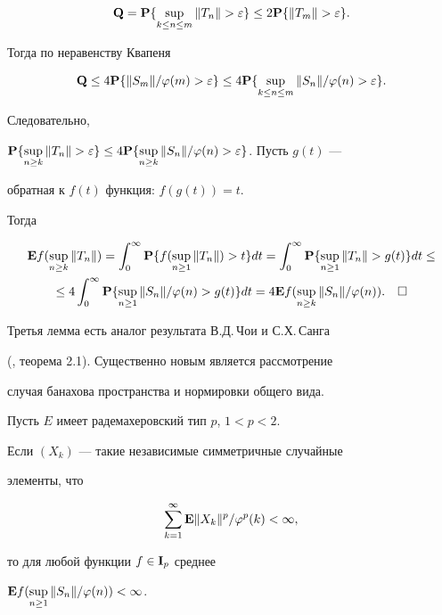 $$


\bold Q=\bold P \{\sup_{k\le n\le m}\| T_{n}\| >


\varepsilon \}\le 2\bold P \{\| T_{m} \| >\varepsilon \}.


$$


Тогда по неравенству Квапеня


$$


\bold Q \le 4{\bold P}


\{\| S_{m} \| /\varphi (m)>\varepsilon \}


\le 4{\bold P} \{ \sup_{k\le n\le m} \| S_{n} \| /


\varphi (n)>\varepsilon \}.


$$


Следовательно,


${\bold P} \{\sup\limits_{n\ge k}\| T_{n} \|>


\varepsilon \}\le 4{\bold P} \{\sup\limits_{n\ge k}\| S_{n}\|


/\varphi (n)>\varepsilon \}$. Пусть $g(t)$ ---


обратная к $f(t)$ функция: $f(g(t))=t$.


Тогда


\begin{multline*}


{\bold E} f(\sup_{n\ge k}\|T_{n} \|)


=\int_0^{\infty}{\bold P} \{f(\sup_{n\ge 1}\|T_{n} \|)>t\}dt= 


\int_0^{\infty}{\bold P} \{\sup_{n\ge 1}\|T_{n} \|>g(t)\}dt\le\\


%


\le 4\int_0^{\infty}{\bold P} \{\sup_{n\ge 1}\|S_{n} \|/\varphi (n)>g(t)\}dt


=4{\bold E} f(\sup_{n\ge k}\|S_{n} \|/\varphi(n)).\quad\square


\end{multline*}





Третья лемма есть аналог результата В.Д.\,Чои и С.Х.\,Санга


(\cite{Choi}, теорема 2.1). Существенно новым является рассмотрение


случая банахова пространства и нормировки общего вида.





\begin{lem} Пусть $E$ имеет радемахеровский тип $p$, $1<p<2$.


Если $(X_{k})$ --- такие независимые симметричные случайные


элементы, что


$$


\sum^{\infty }_{k=1} {\bold E} \|X_{k}\|^{p} /\varphi ^{p} (k)<\infty,


$$


то для любой функции $f\in {\bold I}_{p} $ среднее


${\bold E} f(\sup\limits_{n\ge 1}\|S_{n} \|/\varphi (n))<\infty $.


\end{lem}





